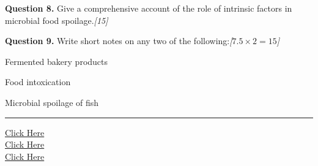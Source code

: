 \documentclass[11pt,a4paper]{article}
\newcommand{\pts}[1]{\hfill   \textit{[#1]}}
\begin{document}
\medskip


\noindent   \textbf{Question 8.} Give a comprehensive account of the role of intrinsic factors in microbial food spoilage.\pts{15}

\medskip


\noindent   \textbf{Question 9.} Write short notes on any two of the following:\pts{$7.5  \times 2 = 15$}

\begin{parts}
  \item Fermented bakery products
  \item Food intoxication
  \item Microbial spoilage of fish
\end{parts}

\vfill
\rule{\linewidth}{0.4pt}

\begin{center}\small
\href{https://bhu-exam.vercel.app/}{Click Here}\\[4pt]\href{https://me-aryan.vercel.app/}{Click Here}\\[4pt]\href{https://quashan-me.vercel.app/}{Click Here}
\end{center}
\end{document}

